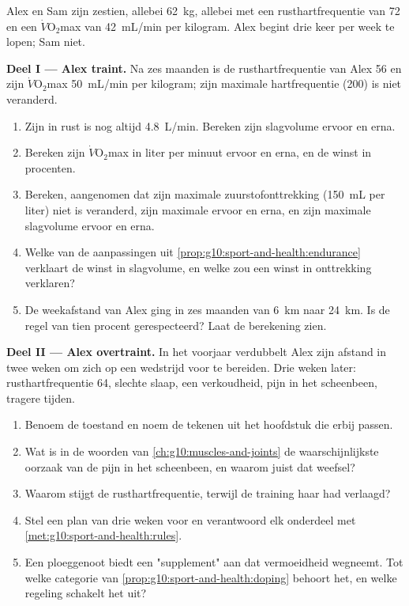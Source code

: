\begin{problem}
\label{pb:g10:sport-and-health:1}
Alex en Sam zijn zestien, allebei \qty{62}{kg}, allebei met een
rusthartfrequentie van 72 en een $\dot V\!\mathrm{O_2}$max van
\qty{42}{mL/min} per kilogram. Alex begint drie keer per week te lopen;
Sam niet.

\medskip
\noindent\textbf{Deel I --- Alex traint.}
Na zes maanden is de rusthartfrequentie van Alex 56 en zijn
$\dot V\!\mathrm{O_2}$max \qty{50}{mL/min} per kilogram; zijn maximale
hartfrequentie (200) is niet veranderd.
\begin{enumerate}
  \item Zijn  in rust is nog altijd \qty{4.8}{L/min}.
        Bereken zijn slagvolume ervoor en erna.
  \item Bereken zijn $\dot V\!\mathrm{O_2}$max in liter per minuut ervoor
        en erna, en de winst in procenten.
  \item Bereken, aangenomen dat zijn maximale zuurstofonttrekking
        (\qty{150}{mL} per liter) niet is veranderd, zijn maximale
         ervoor en erna, en zijn maximale slagvolume
        ervoor en erna.
  \item Welke van de aanpassingen uit
        \cref{prop:g10:sport-and-health:endurance} verklaart de winst in
        slagvolume, en welke zou een winst in onttrekking verklaren?
  \item De weekafstand van Alex ging in zes maanden van \qty{6}{km} naar
        \qty{24}{km}. Is de regel van tien procent gerespecteerd? Laat de
        berekening zien.
\end{enumerate}

\medskip
\noindent\textbf{Deel II --- Alex overtraint.}
In het voorjaar verdubbelt Alex zijn afstand in twee weken om zich op een
wedstrijd voor te bereiden. Drie weken later: rusthartfrequentie 64,
slechte slaap, een verkoudheid, pijn in het scheenbeen, tragere tijden.
\begin{enumerate}[resume]
  \item Benoem de toestand en noem de tekenen uit het hoofdstuk die erbij
        passen.
  \item Wat is in de woorden van \cref{ch:g10:muscles-and-joints} de
        waarschijnlijkste oorzaak van de pijn in het scheenbeen, en
        waarom juist dat weefsel?
  \item Waarom stijgt de rusthartfrequentie, terwijl de training haar had
        verlaagd?
  \item Stel een plan van drie weken voor en verantwoord elk onderdeel
        met \cref{met:g10:sport-and-health:rules}.
  \item Een ploeggenoot biedt een "supplement" aan dat vermoeidheid
        wegneemt. Tot welke categorie van
        \cref{prop:g10:sport-and-health:doping} behoort het, en welke
        regeling schakelt het uit?
\end{enumerate}


\end{problem}
